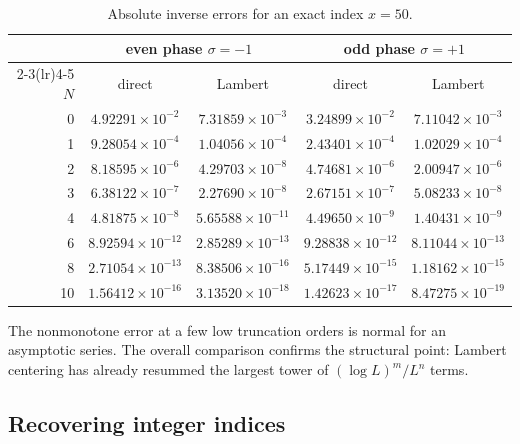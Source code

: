 \documentclass[11pt,a4paper]{article}
\numberwithin{equation}{section}
\theoremstyle{definition}
\theoremstyle{remark}
\begin{document}
\begin{table}[htbp]
\centering
\caption{Absolute inverse errors for an exact index \(x=50\).}
\label{tab:inverse-errors}
\begin{tabular}{rcccc}
\toprule
&\multicolumn{2}{c}{even phase \(\sigma=-1\)}
&\multicolumn{2}{c}{odd phase \(\sigma=+1\)}\\
\cmidrule(lr){2-3}\cmidrule(lr){4-5}
\(N\)&direct&Lambert&direct&Lambert\\
\midrule
0  &\(4.92291\times10^{-2}\)&\(7.31859\times10^{-3}\)
   &\(3.24899\times10^{-2}\)&\(7.11042\times10^{-3}\)\\
1  &\(9.28054\times10^{-4}\)&\(1.04056\times10^{-4}\)
   &\(2.43401\times10^{-4}\)&\(1.02029\times10^{-4}\)\\
2  &\(8.18595\times10^{-6}\)&\(4.29703\times10^{-8}\)
   &\(4.74681\times10^{-6}\)&\(2.00947\times10^{-6}\)\\
3  &\(6.38122\times10^{-7}\)&\(2.27690\times10^{-8}\)
   &\(2.67151\times10^{-7}\)&\(5.08233\times10^{-8}\)\\
4  &\(4.81875\times10^{-8}\)&\(5.65588\times10^{-11}\)
   &\(4.49650\times10^{-9}\)&\(1.40431\times10^{-9}\)\\
6  &\(8.92594\times10^{-12}\)&\(2.85289\times10^{-13}\)
   &\(9.28838\times10^{-12}\)&\(8.11044\times10^{-13}\)\\
8  &\(2.71054\times10^{-13}\)&\(8.38506\times10^{-16}\)
   &\(5.17449\times10^{-15}\)&\(1.18162\times10^{-15}\)\\
10 &\(1.56412\times10^{-16}\)&\(3.13520\times10^{-18}\)
   &\(1.42623\times10^{-17}\)&\(8.47275\times10^{-19}\)\\
\bottomrule
\end{tabular}
\end{table}

The nonmonotone error at a few low truncation orders is normal for an
asymptotic series.  The overall comparison confirms the structural point:
Lambert centering has already resummed the largest tower of
\((\log L)^m/L^n\) terms.

\subsection{Recovering integer indices}
\end{document}
